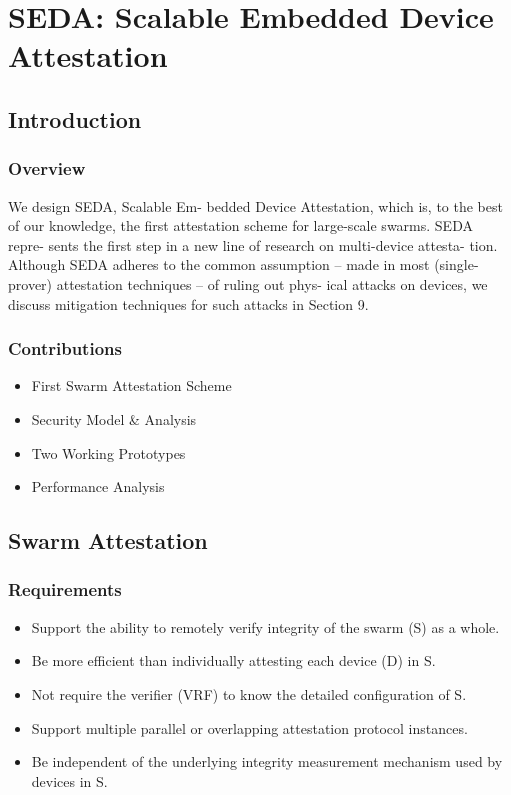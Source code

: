\documentclass{article}
\begin{document}
\section{SEDA: Scalable Embedded Device Attestation}

\subsection{Introduction}

\subsubsection{Overview}

We design SEDA, Scalable Em-
bedded Device Attestation, which is, to the best of our knowledge,
the first attestation scheme for large-scale swarms. SEDA repre-
sents the first step in a new line of research on multi-device attesta-
tion. Although SEDA adheres to the common assumption – made
in most (single-prover) attestation techniques – of ruling out phys-
ical attacks on devices, we discuss mitigation techniques for such
attacks in Section 9.

\subsubsection{Contributions}

\begin{itemize}
\item First Swarm Attestation Scheme
\item Security Model \& Analysis
\item Two Working Prototypes
\item Performance Analysis
\end{itemize}

\subsection{Swarm Attestation}

\subsubsection{Requirements}

\begin{itemize}
\item Support the ability to remotely verify integrity of the swarm (S) as a whole.
\item Be more efficient than individually attesting each device (D) in S.
\item Not require the verifier (VRF) to know the detailed configuration of S.
\item Support multiple parallel or overlapping attestation protocol instances.
\item Be independent of the underlying integrity measurement mechanism used by devices in S.
\end{itemize}
\end{document}

